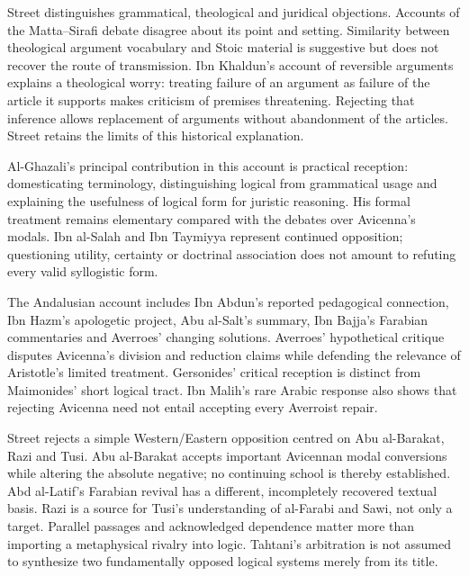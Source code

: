 Street distinguishes grammatical, theological
and juridical objections. Accounts of the
Matta--Sirafi debate disagree about its point
and setting. Similarity between theological
argument vocabulary and Stoic material is
suggestive but does not recover the route
of transmission. Ibn Khaldun's account of
reversible arguments explains a theological
worry: treating failure of an argument as
failure of the article it supports makes
criticism of premises threatening. Rejecting
that inference allows replacement of arguments
without abandonment of the articles. Street
retains the limits of this historical explanation.
\cite[pp.~554--558]{Street2004ArabicLogicHHL}

Al-Ghazali's principal contribution in this
account is practical reception: domesticating
terminology, distinguishing logical from
grammatical usage and explaining the usefulness
of logical form for juristic reasoning. His
formal treatment remains elementary compared
with the debates over Avicenna's modals.
Ibn al-Salah and Ibn Taymiyya represent
continued opposition; questioning utility,
certainty or doctrinal association does not
amount to refuting every valid syllogistic form.
\cite[pp.~558--560]{Street2004ArabicLogicHHL}

The Andalusian account includes Ibn Abdun's
reported pedagogical connection, Ibn Hazm's
apologetic project, Abu al-Salt's summary,
Ibn Bajja's Farabian commentaries and Averroes'
changing solutions. Averroes' hypothetical
critique disputes Avicenna's division and
reduction claims while defending the relevance
of Aristotle's limited treatment. Gersonides'
critical reception is distinct from Maimonides'
short logical tract. Ibn Malih's rare Arabic
response also shows that rejecting Avicenna
need not entail accepting every Averroist repair.
\cite[pp.~561--567]{Street2004ArabicLogicHHL}

Street rejects a simple Western/Eastern
opposition centred on Abu al-Barakat, Razi
and Tusi. Abu al-Barakat accepts important
Avicennan modal conversions while altering
the absolute negative; no continuing school
is thereby established. Abd al-Latif's
Farabian revival has a different, incompletely
recovered textual basis. Razi is a source
for Tusi's understanding of al-Farabi and
Sawi, not only a target. Parallel passages
and acknowledged dependence matter more
than importing a metaphysical rivalry into
logic. Tahtani's arbitration is not assumed
to synthesize two fundamentally opposed
logical systems merely from its title.
\cite[pp.~568--574]{Street2004ArabicLogicHHL}

